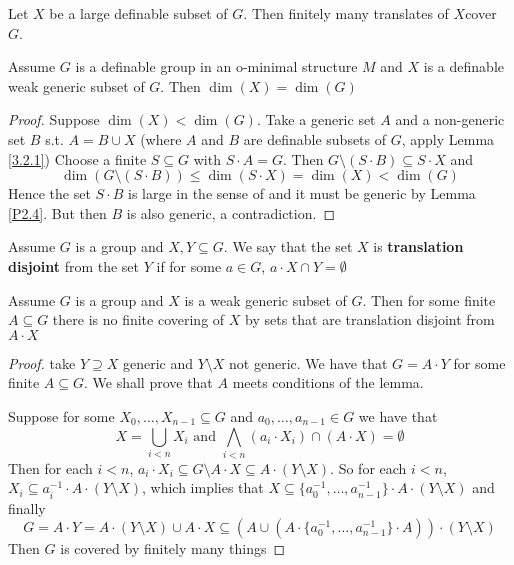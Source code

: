 \documentclass[11pt]{article}
\begin{document}
\begin{lemma}
\label{P2.4}
Let \(X\) be a large definable subset of \(G\). Then finitely many translates of \(X\)cover \(G\).
\end{lemma}

\begin{proposition}[]
\label{3.3.1}
Assume \(G\) is a definable group in an o-minimal structure \(M\) and \(X\) is a definable weak
generic subset of \(G\). Then \(\dim(X)=\dim(G)\)
\end{proposition}

\begin{proof}
Suppose \(\dim(X)<\dim(G)\). Take a generic set \(A\) and a non-generic set \(B\)
s.t. \(A=B\cup X\) (where \(A\) and \(B\) are definable subsets of \(G\), apply Lemma \ref{3.2.1})
Choose a finite \(S\subseteq G\) with \(S\cdot A=G\). Then \(G\setminus(S\cdot B)\subseteq S\cdot X\) and
\begin{equation*}
\dim(G\setminus(S\cdot B))\le\dim(S\cdot X)=\dim(X)<\dim(G)
\end{equation*}
Hence the set \(S\cdot B\) is large in the sense of \cite{PILLAY1988239} and it must be generic by
Lemma \ref{P2.4}. But then \(B\) is also  generic, a contradiction.
\end{proof}

Assume \(G\) is a group and \(X,Y\subseteq G\). We say that the set \(X\) is \textbf{translation disjoint} from
the set \(Y\) if for some \(a\in G\), \(a\cdot X\cap Y=\emptyset\)

\begin{lemma}[]
\label{3.3.2}
Assume \(G\) is a group and \(X\) is a weak generic subset of \(G\). Then for some
finite \(A\subseteq G\) there is no finite covering of \(X\) by sets that are translation disjoint
from \(A\cdot X\)
\end{lemma}

\begin{proof}
take \(Y\supseteq X\) generic and \(Y\setminus X\) not generic. We have that \(G=A\cdot Y\) for some
finite \(A\subseteq G\). We shall prove that \(A\) meets conditions of the lemma.

Suppose for some \(X_0,\dots,X_{n-1}\subseteq G\) and \(a_0,\dots,a_{n-1}\in G\) we have that
\begin{equation*}
X=\bigcup_{i<n}X_i\text{ and }\bigwedge_{i<n}(a_i\cdot X_i)\cap(A\cdot X)=\emptyset
\end{equation*}
Then for each \(i<n\), \(a_i\cdot X_i\subseteq G\setminus A\cdot X\subseteq A\cdot(Y\setminus X)\). So for
each \(i<n\), \(X_i\subseteq a_i^{-1}\cdot A\cdot(Y\setminus X)\), which implies
that \(X\subseteq\{a_0^{-1},\dots,a_{n-1}^{-1}\}\cdot A\cdot(Y\setminus X)\) and finally
\begin{equation*}
G=A\cdot Y=A\cdot(Y\setminus X)\cup A\cdot X\subseteq(A\cup(A\cdot\{a_0^{-1},\dots,a_{n-1}^{-1}\}\cdot A))\cdot(Y\setminus X)
\end{equation*}
Then \(G\) is covered by finitely many things
\end{proof}
\end{document}
